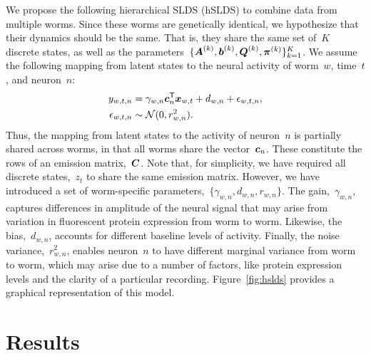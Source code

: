 \documentclass{article}
\begin{document}
We propose the following hierarchical SLDS (hSLDS) to combine data from
multiple worms. Since these worms are genetically identical, we hypothesize
that their dynamics should be the same. That is, they share the same set
of~$K$ discrete states, as well as the
parameters~$\{\boldsymbol{A}^{(k)}, \boldsymbol{b}^{(k)}, \boldsymbol{Q}^{(k)}, \boldsymbol{\pi}^{(k)}\}_{k=1}^K$.
We assume the following mapping from latent states to the neural activity
of worm~$w$, time~$t$, and neuron~$n$:
\begin{align}
  y_{w,t,n} &= \gamma_{w,n} \boldsymbol{c}_n^{\mathsf{T}} \boldsymbol{x}_{w,t} + d_{w,n} + \epsilon_{w,t,n}, \\
  \epsilon_{w,t,n} &\sim \mathcal{N}(0, r_{w,n}^2).
\end{align}
Thus, the mapping from latent states to the activity of neuron~$n$ is
partially shared across worms, in that all worms share the
vector~$\boldsymbol{c}_n$.  These constitute the rows of an emission
matrix,~$\boldsymbol{C}$. Note that, for simplicity, we have required all
discrete states,~$z_t$ to share the same emission matrix. However, we
have introduced a set of worm-specific parameters,~$\{\gamma_{w,n},
d_{w,n}, r_{w,n}\}$. The gain,~$\gamma_{w,n}$, captures differences in
amplitude of the neural signal that may arise from variation in
fluorescent protein expression from worm to worm.  Likewise, the
bias,~$d_{w,n}$, accounts for different baseline levels of
activity. Finally, the noise variance,~$r_{w,n}^2$, enables neuron~$n$
to have different marginal variance from worm to worm, which may arise
due to a number of factors, like protein expression levels and the
clarity of a particular recording.  Figure~\ref{fig:hslds} provides a
graphical representation of this model.

\section{Results}
\label{sec:results}




\appendix
\end{document}
